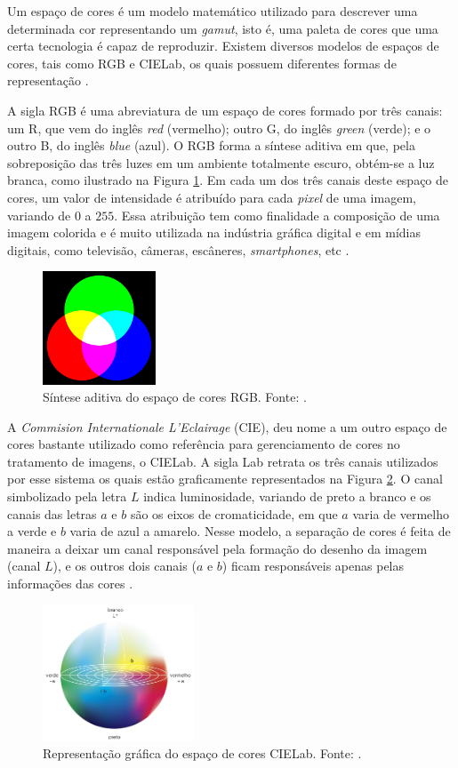Um espaço de cores é um modelo matemático utilizado para descrever uma determinada cor representando um \emph{gamut}, isto é, uma paleta de cores que uma certa tecnologia é capaz de reproduzir. Existem diversos modelos de espaços de cores, tais como RGB e CIELab, os quais possuem diferentes  formas de representação \cite{ref:galleti}.

A sigla RGB é uma abreviatura de um espaço de cores formado por três canais: um R, que vem do inglês \emph{red} (vermelho); outro G, do inglês \emph{green} (verde); e o outro B, do inglês \emph{blue} (azul). O RGB forma a síntese aditiva em que, pela sobreposição das três luzes em um ambiente totalmente escuro, obtém-se a luz branca, como ilustrado na Figura \ref{fig:rgb}. Em cada um dos três canais deste espaço de cores, um valor de intensidade é atribuído para cada \emph{pixel} de uma imagem, variando de $0$ a $255$. Essa atribuição tem como finalidade a composição de uma imagem colorida e é muito utilizada na indústria gráfica digital e em mídias digitais, como televisão, câmeras, escâneres, \emph{smartphones}, etc \cite{ref:galleti}.

\begin{figure}[h!]
	\centering
	\caption{Síntese aditiva do espaço de cores RGB. Fonte: \cite{ref:galleti}.}
	\label{fig:rgb}
	\includegraphics[width=0.3\textwidth]{./img/rgb}
\end{figure}


A \emph{Commision Internationale L'Eclairage} (CIE), deu nome a um outro espaço de cores bastante utilizado como referência para gerenciamento de cores no tratamento de imagens, o CIELab. A sigla Lab retrata os três canais utilizados por esse sistema os quais estão graficamente representados na Figura \ref{fig:cielab}. O canal simbolizado pela letra $L$ indica luminosidade, variando de preto a branco e os canais das letras $a$ e $b$ são os eixos de cromaticidade, em que $a$ varia de vermelho a verde e $b$ varia de azul a amarelo. Nesse modelo, a separação de cores é feita de maneira a deixar um canal responsável pela formação do desenho da imagem (canal $L$), e os outros dois canais ($a$ e $b$) ficam responsáveis apenas pelas informações das cores \cite{ref:galleti}.

\begin{figure}[h]
	\centering
	\caption{Representação gráfica do espaço de cores CIELab. Fonte: \cite{ref:galleti}.}
	\label{fig:cielab}
	\includegraphics[width=0.4\textwidth]{./img/cielab}
\end{figure}
